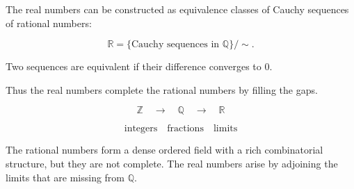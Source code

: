 \begin{exposition}
\medskip
\end{exposition}


\begin{tcolorbox}[colback=gray!6, colframe=gray!40, arc=2pt,
title={Completion to the Real Numbers}]

The real numbers can be constructed as equivalence classes
of Cauchy sequences of rational numbers:

\[
\mathbb{R}
=
\{\text{Cauchy sequences in }\mathbb{Q}\}/\sim.
\]

Two sequences are equivalent if their difference converges to $0$.

Thus the real numbers complete the rational numbers by filling
the gaps.

\end{tcolorbox}

\begin{exposition}
\medskip
\end{exposition}

\begin{remark*}

\[
\mathbb{Z}
\quad\longrightarrow\quad
\mathbb{Q}
\quad\longrightarrow\quad
\mathbb{R}
\]

\[
\text{integers}
\quad
\text{fractions}
\quad
\text{limits}
\]

The rational numbers form a dense ordered field with a rich
combinatorial structure, but they are not complete.  The real numbers
arise by adjoining the limits that are missing from $\mathbb{Q}$.

\end{remark*}